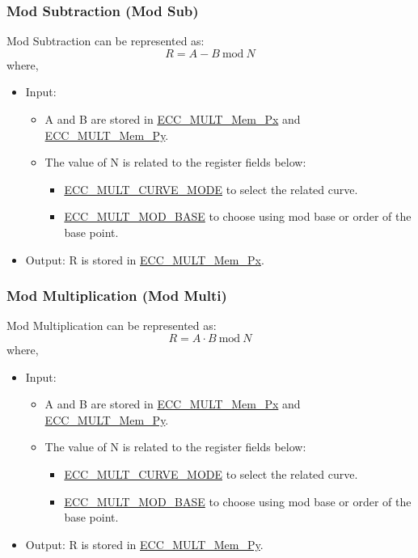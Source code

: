 \documentclass[main\_\_EN.tex]{subfiles}
\begin{document}
\subsubsection{Mod Subtraction (Mod Sub)}
Mod Subtraction can be represented as:
\[
R = A - B \ \textrm{mod}\ N
\]
where,
\begin{itemize}
    \item Input:
    \begin{itemize}
        \item A and B are stored in \hyperref[tab:ecc-memory]{ECC\_MULT\_Mem\_Px} and \hyperref[tab:ecc-memory]{ECC\_MULT\_Mem\_Py}.
        \item The value of N is related to the register fields below:
        \begin{itemize}
            \item \hyperref[fielddesc:ECCMULTCURVEMODE]{ECC\_MULT\_CURVE\_MODE} to select the related curve.
            \item \hyperref[fielddesc:ECCMULTMODBASE]{ECC\_MULT\_MOD\_BASE} to choose using mod base or order of the base point.
        \end{itemize}
    \end{itemize}
    \item Output: R is stored in \hyperref[tab:ecc-memory]{ECC\_MULT\_Mem\_Px}.
\end{itemize}

\subsubsection{Mod Multiplication (Mod Multi)}
Mod Multiplication can be represented as:
\[
R = A \cdot B \ \textrm{mod}\ N
\]
where,
\begin{itemize}
    \item Input:
    \begin{itemize}
        \item A and B are stored in \hyperref[tab:ecc-memory]{ECC\_MULT\_Mem\_Px} and \hyperref[tab:ecc-memory]{ECC\_MULT\_Mem\_Py}.
        \item The value of N is related to the register fields below:
        \begin{itemize}
            \item \hyperref[fielddesc:ECCMULTCURVEMODE]{ECC\_MULT\_CURVE\_MODE} to select the related curve.
            \item \hyperref[fielddesc:ECCMULTMODBASE]{ECC\_MULT\_MOD\_BASE} to choose using mod base or order of the base point.
        \end{itemize}
    \end{itemize}
    \item Output: R is stored in \hyperref[tab:ecc-memory]{ECC\_MULT\_Mem\_Py}.
\end{itemize}
\end{document}
